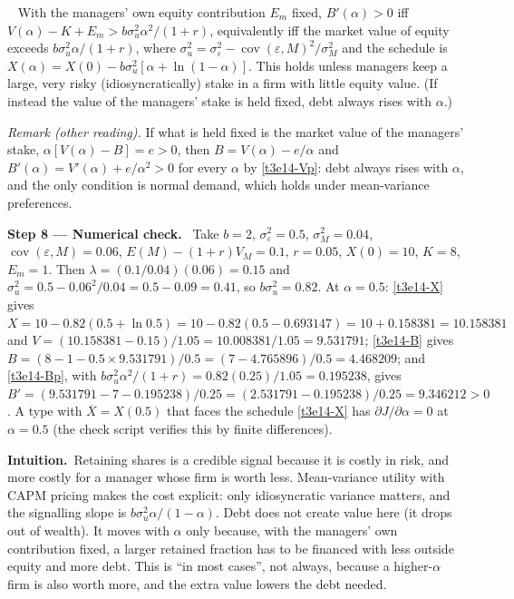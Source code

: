 \documentclass[11pt,a4paper]{article}
\newcommand{\step}[2]{\par\medskip\noindent\textbf{Step #1 --- #2.}~}
\newcommand{\intuition}{\par\medskip\noindent\textbf{Intuition.}~}
\newcommand{\answer}[1]{\par\smallskip\noindent\fbox{\textbf{Answer #1.}}~}
\begin{document}
\answer{(a)} With the managers' own equity contribution $E_m$ fixed, $B'(\alpha)>0$ iff $V(\alpha)-K+E_m>b\sigma_u^2\alpha^2/(1+r)$, equivalently iff the market value of equity exceeds $b\sigma_u^2\alpha/(1+r)$, where $\sigma_u^2=\sigma_\varepsilon^2-\operatorname{cov}(\varepsilon,M)^2/\sigma_M^2$ and the schedule is $X(\alpha)=X(0)-b\sigma_u^2[\alpha+\ln(1-\alpha)]$. This holds unless managers keep a large, very risky (idiosyncratically) stake in a firm with little equity value. (If instead the value of the managers' stake is held fixed, debt always rises with $\alpha$.)

\emph{Remark (other reading).} If what is held fixed is the market value of the managers' stake,
$\alpha[V(\alpha)-B]=e>0$, then $B=V(\alpha)-e/\alpha$ and $B'(\alpha)=V'(\alpha)+e/\alpha^2>0$ for every
$\alpha$ by \eqref{t3e14-Vp}: debt always rises with $\alpha$, and the only condition is
normal demand, which holds under mean-variance preferences.

\step{8}{Numerical check} Take $b=2$, $\sigma_\varepsilon^2=0.5$, $\sigma_M^2=0.04$,
$\operatorname{cov}(\varepsilon,M)=0.06$, $E(M)-(1+r)V_M=0.1$, $r=0.05$, $X(0)=10$, $K=8$, $E_m=1$. Then
$\lambda=(0.1/0.04)(0.06)=0.15$ and $\sigma_u^2=0.5-0.06^2/0.04=0.5-0.09=0.41$, so $b\sigma_u^2=0.82$. At $\alpha=0.5$: \eqref{t3e14-X} gives
$X=10-0.82(0.5+\ln0.5)=10-0.82(0.5-0.693147)=10+0.158381=10.158381$ and $V=(10.158381-0.15)/1.05=10.008381/1.05=9.531791$; \eqref{t3e14-B} gives
$B=(8-1-0.5\times9.531791)/0.5=(7-4.765896)/0.5=4.468209$; and \eqref{t3e14-Bp}, with $b\sigma_u^2\alpha^2/(1+r)=0.82(0.25)/1.05=0.195238$, gives
$B'=(9.531791-7-0.195238)/0.25=(2.531791-0.195238)/0.25=9.346212>0$. A type with $\overline X=X(0.5)$ that faces the schedule
\eqref{t3e14-X} has $\partial J/\partial\alpha=0$ at $\alpha=0.5$ (the check script verifies this by finite
differences).

\intuition Retaining shares is a credible signal because it is costly in risk, and more costly for a
manager whose firm is worth less. Mean-variance utility with CAPM pricing makes the cost explicit:
only idiosyncratic variance matters, and the signalling slope is $b\sigma_u^2\alpha/(1-\alpha)$. Debt does
not create value here (it drops out of wealth). It moves with $\alpha$ only because, with the managers'
own contribution fixed, a larger retained fraction has to be financed with less outside equity and more
debt. This is ``in most cases'', not always, because a higher-$\alpha$ firm is also worth more, and the
extra value lowers the debt needed.
\end{document}

